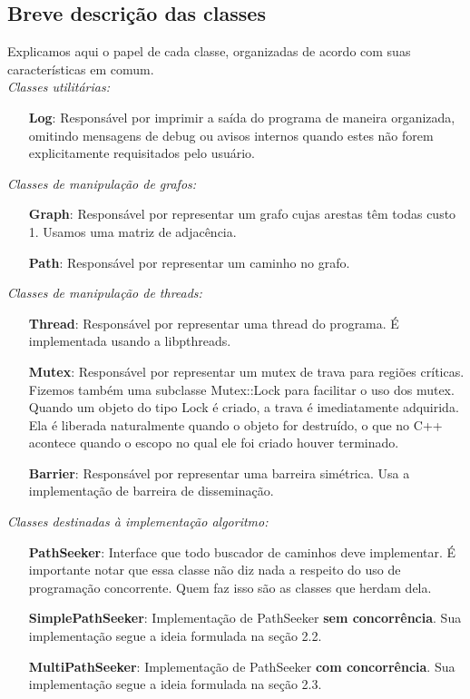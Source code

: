 \documentclass[a4paper,11pt]{article}
\begin{document}
  \subsection{Breve descrição das classes}
    Explicamos aqui o papel de cada classe, organizadas de acordo com suas
    características em comum. \\

    \textit{Classes utilitárias:}
    \begin{itemize}
      \item[\textbf{Log}:]
        Responsável por imprimir a saída do programa de maneira organizada,
        omitindo mensagens de debug ou avisos internos quando estes não forem
        explicitamente requisitados pelo usuário.
    \end{itemize}

    \textit{Classes de manipulação de grafos:}
    \begin{itemize}
      \item[\textbf{Graph}:]
        Responsável por representar um grafo cujas arestas têm todas custo 1.
        Usamos uma matriz de adjacência.
      \item[\textbf{Path}:]
        Responsável por representar um caminho no grafo.
    \end{itemize}

    \textit{Classes de manipulação de threads:}
    \begin{itemize}
      \item[\textbf{Thread}:]
        Responsável por representar uma thread do programa. É implementada
        usando a libpthreads.
      \item[\textbf{Mutex}:]
        Responsável por representar um mutex de trava para regiões críticas.
        Fizemos também uma subclasse Mutex::Lock para facilitar o uso dos mutex.
        Quando um objeto do tipo Lock é criado, a trava é imediatamente
        adquirida. Ela é liberada naturalmente quando o objeto for destruído,
        o que no C++ acontece quando o escopo no qual ele foi criado houver
        terminado.
      \item[\textbf{Barrier}:]
        Responsável por representar uma barreira simétrica. Usa a implementação
        de barreira de disseminação.
    \end{itemize}

    \textit{Classes destinadas à implementação algoritmo:}
    \begin{itemize}
      \item[\textbf{PathSeeker}:]
        Interface que todo buscador de caminhos deve implementar. É importante
        notar que essa classe não diz nada a respeito do uso de programação
        concorrente. Quem faz isso são as classes que herdam dela.
      \item[\textbf{SimplePathSeeker}:]
        Implementação de PathSeeker \textbf{sem concorrência}. Sua implementação
        segue a ideia formulada na seção 2.2.
      \item[\textbf{MultiPathSeeker}:]
        Implementação de PathSeeker \textbf{com concorrência}. Sua implementação
        segue a ideia formulada na seção 2.3.
    \end{itemize}
\end{document}
